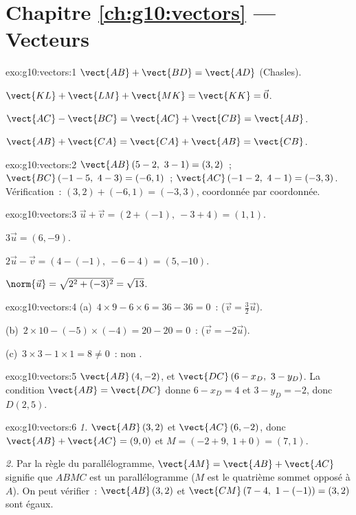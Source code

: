 \section*{Chapitre \ref{ch:g10:vectors} --- Vecteurs}

\begin{solution}{exo:g10:vectors:1}
$\vect{AB} + \vect{BD} = \vect{AD}$ (Chasles).

$\vect{KL} + \vect{LM} + \vect{MK} = \vect{KK} = \vec 0$.

$\vect{AC} - \vect{BC} = \vect{AC} + \vect{CB} = \vect{AB}$.

$\vect{AB} + \vect{CA} = \vect{CA} + \vect{AB} = \vect{CB}$.
\end{solution}

\begin{solution}{exo:g10:vectors:2}
$\vect{AB}\,(5-2,\ 3-1) = (3, 2)$~; \quad
$\vect{BC}\,(-1-5,\ 4-3) = (-6, 1)$~; \quad
$\vect{AC}\,(-1-2,\ 4-1) = (-3, 3)$.
Vérification~: $(3, 2) + (-6, 1) = (-3, 3)$, coordonnée par
coordonnée.
\end{solution}

\begin{solution}{exo:g10:vectors:3}
$\vec u + \vec v = (2 + (-1),\ -3 + 4) = (1, 1)$.

$3\vec u = (6, -9)$.

$2\vec u - \vec v = (4 - (-1),\ -6 - 4) = (5, -10)$.

$\norm{\vec u} = \sqrt{2^2 + (-3)^2} = \sqrt{13}$.
\end{solution}

\begin{solution}{exo:g10:vectors:4}
(a)~$4 \times 9 - 6 \times 6 = 36 - 36 = 0$~: 
($\vec v = \frac32 \vec u$).

(b)~$2 \times 10 - (-5) \times (-4) = 20 - 20 = 0$~: 
($\vec v = -2\vec u$).

(c)~$3 \times 3 - 1 \times 1 = 8 \neq 0$~: non .
\end{solution}

\begin{solution}{exo:g10:vectors:5}
$\vect{AB}\,(4, -2)$, et $\vect{DC}\,(6 - x_D,\ 3 - y_D)$. La condition
$\vect{AB} = \vect{DC}$ donne $6 - x_D = 4$ et $3 - y_D = -2$, donc
$D(2, 5)$.
\end{solution}

\begin{solution}{exo:g10:vectors:6}
\emph{1.} $\vect{AB}\,(3, 2)$ et $\vect{AC}\,(6, -2)$, donc
$\vect{AB} + \vect{AC} = (9, 0)$ et
$M = (-2 + 9,\ 1 + 0) = (7, 1)$.

\emph{2.} Par la règle du parallélogramme,
$\vect{AM} = \vect{AB} + \vect{AC}$ signifie que $ABMC$ est un
parallélogramme ($M$ est le quatrième sommet opposé à $A$). On peut
vérifier~: $\vect{AB}\,(3,2)$ et $\vect{CM}\,(7-4,\ 1-(-1)) = (3, 2)$
sont égaux.
\end{solution}

